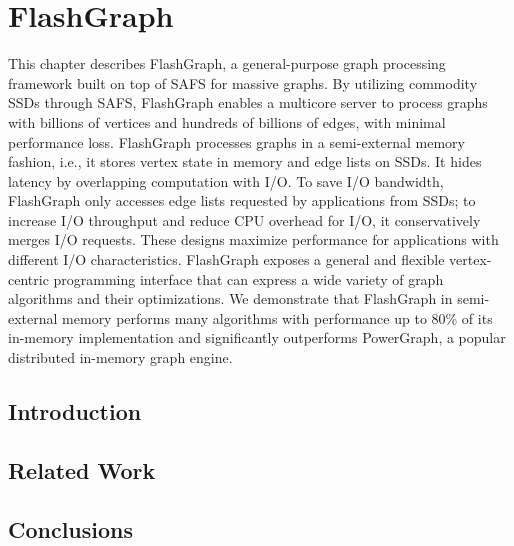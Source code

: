 \chapter{FlashGraph}
\label{sec:fg}

This chapter describes FlashGraph, a general-purpose graph processing framework
built on top of SAFS for massive graphs. By utilizing commodity SSDs through SAFS,
FlashGraph enables a multicore server to process graphs with billions of vertices
and hundreds of billions of edges, with minimal performance loss. FlashGraph
processes graphs in a semi-external memory fashion, i.e., it stores vertex state
in memory and edge lists on SSDs. It hides latency by overlapping computation
with I/O. To save I/O bandwidth, FlashGraph only accesses edge lists requested
by applications from SSDs; to increase I/O throughput and reduce CPU overhead for I/O,
it conservatively merges I/O requests. These designs maximize performance
for applications with different I/O characteristics. FlashGraph exposes
a general and flexible vertex-centric programming interface that can express
a wide variety of graph algorithms and their optimizations. We demonstrate that
FlashGraph in semi-external memory performs many algorithms with performance
up to 80\% of its in-memory implementation and significantly outperforms
PowerGraph, a popular distributed in-memory graph engine.

\section{Introduction}


\section{Related Work}






\section{Conclusions}

